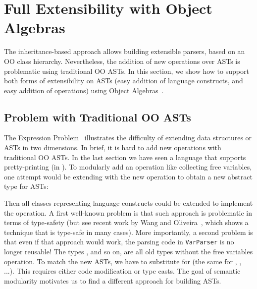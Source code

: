 \section{Full Extensibility with Object Algebras}\label{sec:algebrasandparsing}

The inheritance-based approach allows building extensible parsers, based on an OO class hierarchy.  Nevertheless, the addition of new operations over ASTs is problematic using traditional OO ASTs. In this section, we
show how to support both forms of extensibility on ASTs (easy
addition of language constructs, and easy addition of operations)
using Object Algebras~\cite{Oliveira:2012}.

\subsection{Problem with Traditional OO ASTs}\label{subsec:problemwithoutoa}

The Expression Problem~\cite{wadler1998expression} illustrates the
difficulty of extending data structures or ASTs in two dimensions.
In brief, it is hard to add new operations with traditional OO ASTs.
In the last section we have seen a language
that supports pretty-printing (in ).
To modularly add an operation like collecting free variables, one attempt
would be extending
 with the new operation to obtain a new abstract type
for ASTs:


\noindent Then all classes representing language constructs could be
extended to implement the operation. A first well-known problem is that such
approach is problematic in terms of type-safety (but see recent work
by Wang and Oliveira~\cite{wang2016expression}, which shows a technique that is type-safe
in many cases). More importantly, a second problem is that
even if that approach would work, the parsing code in \lstinline{VarParser} is no longer reusable!
The types , and so on, are all old types without the free variables operation.
To match the new ASTs, we have to substitute  for  (the
same for , , ...). This requires either code modification or type casts.
The goal of semantic modularity motivates us to find a different approach for building ASTs.


